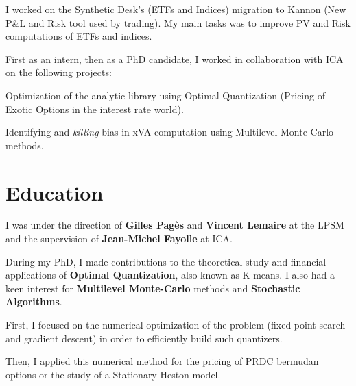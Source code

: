 \documentclass[]{deedy-resume-openfont}
\begin{document}
\sectionsep

I worked on the Synthetic Desk's (ETFs and Indices) migration to Kannon (New P$\&$L and Risk tool used by trading). My main tasks was to improve PV and Risk computations of ETFs and indices.

\sectionsep

First as an intern, then as a PhD candidate, I worked in collaboration with ICA on the following projects:
\vspace{0.1cm}
\begin{tightemize}
	\item[\diamond] Optimization of the analytic library using Optimal Quantization (Pricing of Exotic Options in the interest rate world).
	\item[\diamond] Identifying and \textit{killing} bias in xVA computation using Multilevel Monte-Carlo methods.
\end{tightemize}

\sectionsep




\section{Education}
\sectionsep

I was under the direction of \textbf{Gilles Pagès} and \textbf{Vincent Lemaire} at the LPSM and the supervision of \textbf{Jean-Michel Fayolle} at ICA.

\vspace{0.2cm}
During my PhD, I made contributions to the theoretical study and financial applications of \textbf{Optimal Quantization}, also known as K-means. I also had a keen interest for \textbf{Multilevel Monte-Carlo} methods and \textbf{Stochastic Algorithms}.
\vspace{0.1cm}
\begin{tightemize}
	\item[\diamond] First, I focused on the numerical optimization of the problem (fixed point search and gradient descent) in order to efficiently build such quantizers.
	\item[\diamond] Then, I applied this numerical method for the pricing of PRDC bermudan options or the study of a Stationary Heston model.
\end{tightemize}
\end{document}
